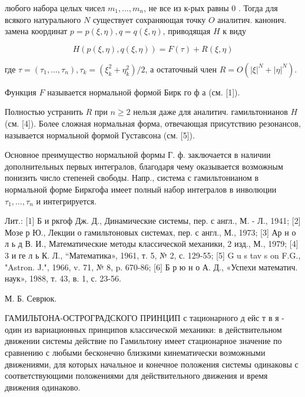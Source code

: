 \documentclass[10pt]{article}
\begin{document}
любого набора целых чисел $m_{1}, \ldots, m_{n}$, не все из к-рых равны 0 . Тогда для всякого натурального $N$ существует сохраняющая точку $O$ аналитич. канонич. замена координат $p=p(\xi, \eta), q=q(\xi, \eta)$, приводящая $H$ к виду



\[

H(p(\xi, \eta), q(\xi, \eta))=F(\tau)+R(\xi, \eta)

\]



где $\tau=\left(\tau_{1}, \ldots, \tau_{n}\right), \tau_{k}=\left(\xi_{k}^{2}+\eta_{k}^{2}\right) / 2$, а остаточный член $R=O\left(|\xi|^{N}+|\eta|^{N}\right)$.



Функция $F$ называется нормальной формой Бирк го ф а (см. [1]).



Полностью устранить $R$ при $n \geqslant 2$ нельзя даже для аналитич. гамильтонианов $H$ (см. [4]). Более сложная нормальная форма, отвечающая присутствию резонансов, называется нормальной формой Густавсона (см. [5]).



Основное преимущество нормальной формы Г. ф. заключается в наличии дополнительных первых интегралов, благодаря чему оказывается возможным понизить число степеней свободы. Напр., система с гамильтонианом в нормальной форме Биркгофа имеет полный набор интегралов в инволюции $\tau_{1}, \ldots, \tau_{n}$ и интегрируется.



Лит.: [1] Б и ркгоф Дж. Д., Динамические системы, пер. с англ., М. - Л., 1941; [2] Мозе р Ю., Лекции о гамильтоновых системах, пер. с англ., М., 1973; [3] Ар н о л ь д В. И., Математические методы классической механики, 2 изд., М., 1979; [4] 3 и ге л ь К. Л., “Математика», 1961, т. 5, № 2, с. 129-55; [5] G u s tav s on F.G., "Astron. J.", 1966, v. 71, № 8, p. 670-86; [6] Б р ю н о А. Д., «Успехи математич. наук», 1988, т. 43, в. 1, с. 23-56.



М. Б. Севрюк.



ГАМИЛЬТОНА-ОСТРОГРАДСКОГО ПРИНЦИП с тационарного д ейс т в я - один из вариационных принципов классической механики: в действительном движении системы действие по Гамильтону имеет стационарное значение по сравнению с любыми бесконечно близкими кинематически возможными движениями, для которых начальное и конечное положения системы одинаковы с соответствующими положениями для действительного движения и время движения одинаково.
\end{document}
